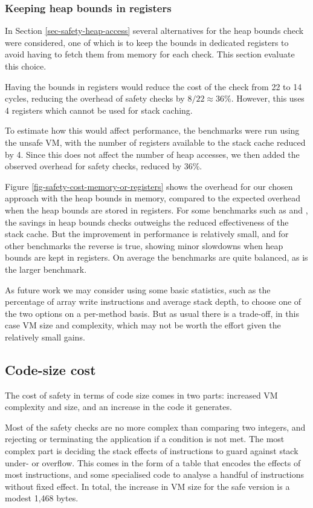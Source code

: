 \subsubsection{Keeping heap bounds in registers}
In Section \ref{sec-safety-heap-access} several alternatives for the heap bounds check were considered, one of which is to keep the bounds in dedicated registers to avoid having to fetch them from memory for each check. This section evaluate this choice.

Having the bounds in registers would reduce the cost of the check from 22 to 14 cycles, reducing the overhead of safety checks by $8/22 \approx 36\%$. However, this uses 4 registers which cannot be used for stack caching.

To estimate how this would affect performance, the benchmarks were run using the unsafe VM, with the number of registers available to the stack cache reduced by 4. Since this does not affect the number of heap accesses, we then added the observed overhead for safety checks, reduced by 36\%.

Figure \ref{fig-safety-cost-memory-or-registers} shows the overhead for our chosen approach with the heap bounds in memory, compared to the expected overhead when the heap bounds are stored in registers. For some benchmarks such as  and , the savings in heap bounds checks outweighs the reduced effectiveness of the stack cache. But the improvement in performance is relatively small, and for other benchmarks the reverse is true, showing minor slowdowns when heap bounds are kept in registers. On average the benchmarks are quite balanced, as is the larger  benchmark.

As future work we may consider using some basic statistics, such as the percentage of array write instructions and average stack depth, to choose one of the two options on a per-method basis. But as usual there is a trade-off, in this case VM size and complexity, which may not be worth the effort given the relatively small gains.

\subsection{Code-size cost}
The cost of safety in terms of code size comes in two parts: increased VM complexity and size, and an increase in the code it generates.

Most of the safety checks are no more complex than comparing two integers, and rejecting or terminating the application if a condition is not met. The most complex part is deciding the stack effects of instructions to guard against stack under- or overflow. This comes in the form of a table that encodes the effects of most instructions, and some specialised code to analyse a handful of instructions without fixed effect. In total, the increase in VM size for the safe version is a modest 1,468 bytes.

